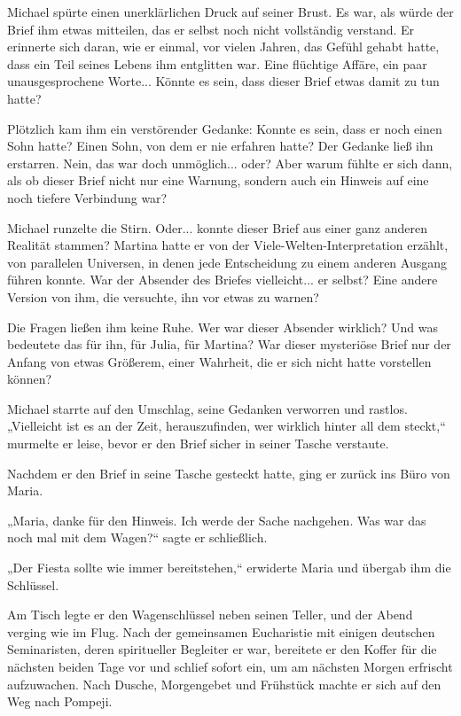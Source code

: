 \documentclass[
]{article}
\begin{document}
Michael spürte einen unerklärlichen Druck auf seiner Brust. Es war, als
würde der Brief ihm etwas mitteilen, das er selbst noch nicht
vollständig verstand. Er erinnerte sich daran, wie er einmal, vor vielen
Jahren, das Gefühl gehabt hatte, dass ein Teil seines Lebens ihm
entglitten war. Eine flüchtige Affäre, ein paar unausgesprochene
Worte... Könnte es sein, dass dieser Brief etwas damit zu tun hatte?

Plötzlich kam ihm ein verstörender Gedanke: Konnte es sein, dass er noch
einen Sohn hatte? Einen Sohn, von dem er nie erfahren hatte? Der Gedanke
ließ ihn erstarren. Nein, das war doch unmöglich... oder? Aber warum
fühlte er sich dann, als ob dieser Brief nicht nur eine Warnung, sondern
auch ein Hinweis auf eine noch tiefere Verbindung war?

Michael runzelte die Stirn. Oder... konnte dieser Brief aus einer ganz
anderen Realität stammen? Martina hatte er von der
Viele-Welten-Interpretation erzählt, von parallelen Universen, in denen
jede Entscheidung zu einem anderen Ausgang führen konnte. War der
Absender des Briefes vielleicht... er selbst? Eine andere Version von
ihm, die versuchte, ihn vor etwas zu warnen?

Die Fragen ließen ihm keine Ruhe. Wer war dieser Absender wirklich? Und
was bedeutete das für ihn, für Julia, für Martina? War dieser mysteriöse
Brief nur der Anfang von etwas Größerem, einer Wahrheit, die er sich
nicht hatte vorstellen können?

Michael starrte auf den Umschlag, seine Gedanken verworren und rastlos.
„Vielleicht ist es an der Zeit, herauszufinden, wer wirklich hinter all
dem steckt,`` murmelte er leise, bevor er den Brief sicher in seiner
Tasche verstaute.

Nachdem er den Brief in seine Tasche gesteckt hatte, ging er zurück ins
Büro von Maria.

„Maria, danke für den Hinweis. Ich werde der Sache nachgehen. Was war
das noch mal mit dem Wagen?{\kern0pt}`` sagte er schließlich.

„Der Fiesta sollte wie immer bereitstehen,`` erwiderte Maria und übergab
ihm die Schlüssel.

Am Tisch legte er den Wagenschlüssel neben seinen Teller, und der Abend
verging wie im Flug. Nach der gemeinsamen Eucharistie mit einigen
deutschen Seminaristen, deren spiritueller Begleiter er war, bereitete
er den Koffer für die nächsten beiden Tage vor und schlief sofort ein,
um am nächsten Morgen erfrischt aufzuwachen. Nach Dusche, Morgengebet
und Frühstück machte er sich auf den Weg nach Pompeji.
\end{document}
